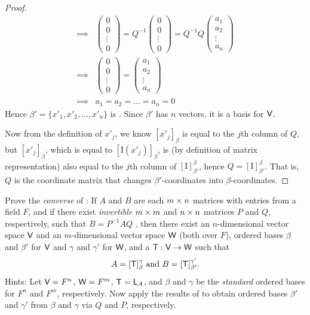 \begin{proof}
\begin{align*}
    \implies & \begin{pmatrix} 0 \\ 0 \\ \vdots \\ 0 \end{pmatrix} = Q^{-1} \begin{pmatrix} 0 \\ 0 \\ \vdots \\ 0 \end{pmatrix}
    = Q^{-1} Q \begin{pmatrix} a_1 \\ a_2 \\ \vdots \\ a_n \end{pmatrix} \\
    \implies & \begin{pmatrix} 0 \\ 0 \\ \vdots \\ 0 \end{pmatrix}
    = \begin{pmatrix} a_1 \\ a_2 \\ \vdots \\ a_n \end{pmatrix} \\
    \implies & a_1 = a_2 = ... = a_n = 0
\end{align*}
Hence \(\beta' = \{ x'_1, x'_2, ..., x'_n \}\) is \LID{}.
Since \(\beta'\) has \(n\) vectors, it is a basis for \(\textsf{V}\).

Now from the definition of \(x'_j\), we know \([x'_j]_{\beta}\) is equal to the \(j\)th column of \(Q\), but \([x'_j]_{\beta}\), which is equal to \([\mathrm{I}(x'_j)]_{\beta}\),
is (by definition of matrix representation) also equal to the \(j\)th column of \([\mathrm{I}]_{\beta'}^{\beta}\), hence \(Q = [\mathrm{I}]_{\beta'}^{\beta}\).
That is, \(Q\) is the coordinate matrix that changes \(\beta'\)-coordinates into \(\beta\)-coordinates.
\end{proof}

\begin{exercise} \label{exercise 2.5.14}
Prove the \emph{converse} of :
If \(A\) and \(B\) are each \(m \times n\) matrices with entries from a field \(F\), and if there exist \emph{invertible} \(m \times m\) and \(n \times n\) matrices \(P\) and \(Q\), respectively,
such that \(B = P^{-1} A Q\) , then there exist an \(n\)-dimensional vector space \(\textsf{V}\) and an \(m\)-dimensional vector space \(\textsf{W}\) (both over \(F\)), ordered bases \(\beta\) and \(\beta'\) for \(\textsf{V}\) and \(\gamma\) and \(\gamma'\) for \(\textsf{W}\),
and a \LTRAN{} \(\textsf{T} : \textsf{V} \to \textsf{W}\) such that
\[
    A = [\textsf{T}]_{\beta}^{\gamma} \text{ and } B = [\textsf{T}]_{\beta'}^{\gamma'}.
\]
Hints: Let \(\textsf{V} = F^n\), \(\textsf{W} = F^m\), \(\textsf{T} = \textsf{L}_A\), and \(\beta\) and \(\gamma\) be the \emph{standard} ordered bases for \(F^n\) and \(F^m\), respectively.
Now apply the results of  to obtain ordered bases \(\beta'\) and \(\gamma'\) from \(\beta\) and \(\gamma\) via \(Q\) and \(P\), respectively.
\end{exercise}

